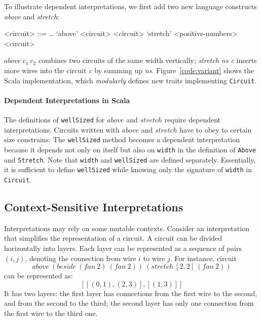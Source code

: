 
To illustrate dependent interpretations, we first add two new language 
constructs \emph{above} and \emph{stretch}:
\setlength{\grammarindent}{5em} %
\begin{grammar}
<circuit> ::= \ldots
\alt `above' <circuit> <circuit>
\alt `stretch' <positive-numbers> <circuit>
\end{grammar}
$above\ c_1\ c_2$ combines two circuits of the same width vertically;
\emph{stretch ns c} inserts more wires into the circuit \emph{c} by
summing up \emph{ns}.
Figure~\ref{code:variant} shows the Scala implementation, which
\emph{modularly} defines new traits implementing \lstinline{Circuit}.



\paragraph{Dependent Interpretations in Scala}
The definitions of \lstinline{wellSized} for $above$ and $stretch$
require dependent interpretations.
Circuits written with $above$ and $stretch$ have to obey to certain
size constrains:%
The \lstinline{wellSized} method becomes a dependent interpretation
because it depends not only on itself but also on \lstinline{width} in the
definition of \lstinline{Above} and \lstinline{Stretch}.
Note that \lstinline{width} and \lstinline{wellSized} are defined separately.
Essentially, it is sufficient to define \lstinline{wellSized} while
knowing only the signature of \lstinline{width} in \lstinline{Circuit}.

\subsection{Context-Sensitive Interpretations}
Interpretations may rely on some mutable contexts.
Consider an interpretation that simplifies the representation of a circuit.
A circuit can be divided horizontally into layers.
Each layer can be represented as a sequence of pairs $(i,j)$, denoting the connection from wire $i$ to wire $j$.
For instance, circuit
$$above\ (beside\ (fan\ 2)\ (fan\ 2))\ (stretch\ [2,2]\ (fan\ 2))$$
can be represented as:
$$[[(0,1), (2,3)], [(1,3)]]$$
It has two layers: the first layer has connections from
the first wire to the second, and from the second to the third; the second layer has
only one connection from the first wire to the third one.

